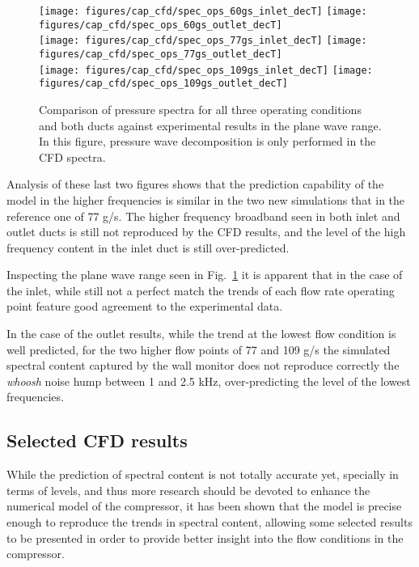 \begin{figure}[htb!]
\centering
\texttt{[image: figures/cap\_cfd/spec\_ops\_60gs\_inlet\_decT]}
\texttt{[image: figures/cap\_cfd/spec\_ops\_60gs\_outlet\_decT]}\\[4mm]
\texttt{[image: figures/cap\_cfd/spec\_ops\_77gs\_inlet\_decT]}
\texttt{[image: figures/cap\_cfd/spec\_ops\_77gs\_outlet\_decT]}\\[4mm]
\texttt{[image: figures/cap\_cfd/spec\_ops\_109gs\_inlet\_decT]}
\texttt{[image: figures/cap\_cfd/spec\_ops\_109gs\_outlet\_decT]}
\caption[Comparison of spectra for the three conditions (plane wave, wall)]{Comparison of pressure spectra for all three operating conditions and both ducts against experimental results in the plane wave range. In this figure, pressure wave
decomposition is only performed in the CFD spectra.}
\label{fig:cfd_ops_spec_all_decT}
\end{figure}

Analysis of these last two figures shows that the prediction capability of the model in the higher frequencies is similar in the two new simulations that in the reference one of 77 g/s. The higher frequency broadband seen in both inlet and outlet ducts is still not reproduced by the CFD results, and the level of the high frequency content in the inlet duct is still over-predicted.

Inspecting the plane wave range seen in Fig.~\ref{fig:cfd_ops_spec_all_decT} it is apparent that in the case of the inlet, while still not a perfect match the trends of each flow rate operating point feature good agreement to the experimental data. 

In the case of the outlet results, while the trend at the lowest flow condition is well predicted, for the two higher flow points of 77 and 109 g/s the simulated spectral content captured by the wall monitor does not reproduce correctly the \emph{whoosh} noise hump between 1 and 2.5 kHz, over-predicting the level of the lowest frequencies.

\subsection{Selected CFD results}

While the prediction of spectral content is not totally accurate yet, specially in terms of levels, and thus more research should be devoted to enhance the numerical model of the compressor, it has been shown that the model is precise enough to reproduce the trends in spectral content, allowing some selected results to be presented in order to provide better insight into the flow conditions in the compressor.

